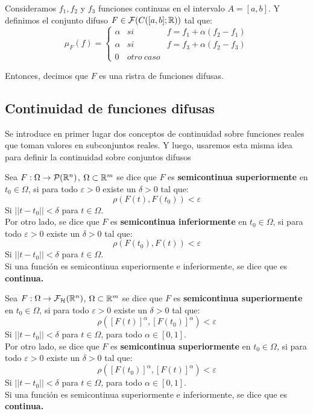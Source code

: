 \begin{ejemplo}
	Consideramos $f_1, f_2$ y $f_3$ funciones continuas en el intervalo $A=[a, b]$. Y definimos el conjunto difuso $F \in \mathcal{F}(C([a, b]; \mathbb R))$ tal que:
	\[
		\mu_F(f) = \left\{
			\begin{array}{ccc}
				\alpha & si & f = f_1 + \alpha(f_2 - f_1) \\
				\alpha & si & f = f_3 + \alpha(f_2 - f_3) \\
				0 & otro~caso & 
			\end{array}
		\right.
	\]
	
	Entonces, decimos que $F$ es una ristra de funciones difusas.
\end{ejemplo}

\fi

\subsection{Continuidad de funciones difusas}
Se introduce en primer lugar dos conceptos de continuidad sobre funciones reales que toman valores en subconjuntos reales. Y luego, usaremos esta misma idea para definir la continuidad sobre conjuntos difusos

\begin{definicion}
	\label{def:funcioncontinua}
	Sea $F : \Omega \rightarrow \mathcal{P}(\mathbb R^n)$, $\Omega \subset \mathbb R^m$ se dice que $F$ es \textbf{semicontinua superiormente} en $t_0 \in \Omega$, si para todo $\varepsilon>0$ existe un $\delta>0$ tal que:
	\[
		\rho(F(t), F(t_0))<\varepsilon
	\]
	Si $||t-t_0||<\delta$ para $t \in \Omega$. \\
	Por otro lado, se dice que $F$  es \textbf{semicontinua inferiormente} en $t_0 \in \Omega$, si para todo $\varepsilon>0$ existe un $\delta>0$ tal que:
	\[
	\rho(F(t_0), F(t))<\varepsilon
	\]
	Si $||t-t_0||<\delta$ para $t \in \Omega$. \\
	Si una función es semicontinua superiormente e inferiormente, se dice que es \textbf{continua.}
\end{definicion}

\begin{definicion}
	Sea $F : \Omega \rightarrow \mathcal{F}_\mathcal{H}(\mathbb R^n)$, $\Omega \subset \mathbb R^m$ se dice que $F$ es \textbf{semicontinua superiormente} en $t_0 \in \Omega$, si para todo $\varepsilon>0$ existe un $\delta>0$ tal que:
	\[
	\rho([F(t)]^\alpha, [F(t_0)]^\alpha)<\varepsilon
	\]
	Si $||t-t_0||<\delta$ para $t \in \Omega$, para todo $\alpha \in [0, 1]$. \\
	Por otro lado, se dice que $F$ es \textbf{semicontinua superiormente} en $t_0 \in \Omega$, si para todo $\varepsilon>0$ existe un $\delta>0$ tal que:
	\[
	\rho([F(t_0)]^\alpha, [F(t)]^\alpha)<\varepsilon
	\]
	Si $||t-t_0||<\delta$ para $t \in \Omega$, para todo $\alpha \in [0, 1]$. \\
	Si una función es semicontinua superiormente e inferiormente, se dice que es \textbf{continua.}
\end{definicion}

